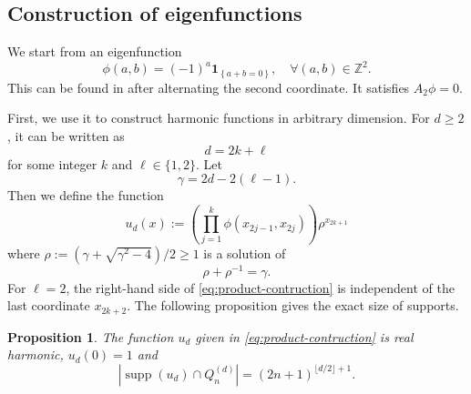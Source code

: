 \documentclass[11pt,reqno]{amsart}
\newcommand\Z{\ensuremath{\mathbb{Z}}}
\newcommand{\supp}{\operatorname{supp}}
\newtheorem{proposition}[theorem]{Proposition}
\theoremstyle{definition}
\theoremstyle{plain}
\numberwithin{equation}{section}
\begin{document}
\subsection{Construction of eigenfunctions}
We start from an eigenfunction
\begin{equation*}
    \phi(a,b)=(-1)^a\mathbf{1}_{\left\{a+b=0\right\}}, \quad \forall (a,b)\in \Z^2.
\end{equation*}
This can be found in\cite[Remark 1.3]{BLMS} after alternating the second coordinate. It satisfies $ A_2\phi =0$.


First, we use it to construct harmonic functions in arbitrary dimension. For $d\ge 2$, it can be written as
\begin{equation*}
    d=2k+\ell 
\end{equation*}
for some integer $k$ and $\ell\in \{1,2\}$. Let 
\begin{equation*}
    \gamma=2d-2(\ell-1).
\end{equation*}
Then we define the function
\begin{equation}\label{eq:product-contruction}
    u_d(x):=\left(\prod_{j=1}^k \phi(x_{2j-1},x_{2j})\right)\rho^{x_{2k+1}}
\end{equation}
where $\rho:=(\gamma+\sqrt{\gamma^2-4})/2\ge 1$ is a solution of
\begin{equation*}
    \rho+\rho^{-1}=\gamma.
\end{equation*}
For $\ell=2$, the right-hand side of \eqref{eq:product-contruction} is independent of the last coordinate $x_{2k+2}$. The following proposition gives the exact size of supports.
\begin{proposition}
    The function $u_d$ given in \eqref{eq:product-contruction} is real harmonic, $u_d(0)=1$ and 
    \begin{equation*}
        |\supp(u_d)\cap Q_n^{(d)}|=(2n+1)^{\lfloor d/2\rfloor+1}.
    \end{equation*}
\end{proposition}
\end{document}
